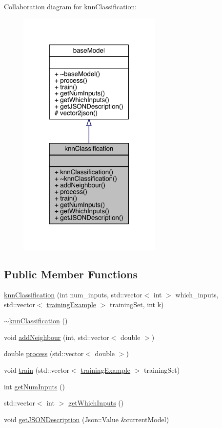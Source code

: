 Collaboration diagram for knn\+Classification\+:\nopagebreak
\begin{figure}[H]
\begin{center}
\leavevmode
\includegraphics[width=202pt]{classknn_classification__coll__graph}
\end{center}
\end{figure}
\subsection*{Public Member Functions}
\begin{DoxyCompactItemize}
\item 
\hyperlink{classknn_classification_a93e0eda34ff02a37baaa8700b46ec5fd}{knn\+Classification} (int num\+\_\+inputs, std\+::vector$<$ int $>$ which\+\_\+inputs, std\+::vector$<$ \hyperlink{structtraining_example}{training\+Example} $>$ training\+Set, int k)
\item 
\hyperlink{classknn_classification_a37e034151bb6d69c3952454df630dd80}{$\sim$knn\+Classification} ()
\item 
void \hyperlink{classknn_classification_a591f953b182fed995ebfb13c712b76d5}{add\+Neighbour} (int, std\+::vector$<$ double $>$)
\item 
double \hyperlink{classknn_classification_a909050a125c4bf5cc2e48db0202fcb79}{process} (std\+::vector$<$ double $>$)
\item 
void \hyperlink{classknn_classification_ae159e53f542d08d04c76760f2e25e843}{train} (std\+::vector$<$ \hyperlink{structtraining_example}{training\+Example} $>$ training\+Set)
\item 
int \hyperlink{classknn_classification_a3f9c8fb78c6a66f0ab9440629140400d}{get\+Num\+Inputs} ()
\item 
std\+::vector$<$ int $>$ \hyperlink{classknn_classification_af7db9297f695e67df6af08719da37921}{get\+Which\+Inputs} ()
\item 
void \hyperlink{classknn_classification_a456b4b1b0fedb8f8fbe6d810bd80ceb8}{get\+J\+S\+O\+N\+Description} (Json\+::\+Value \&current\+Model)
\end{DoxyCompactItemize}
